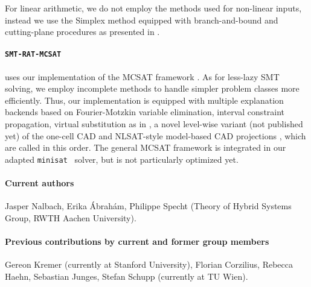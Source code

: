 \documentclass{article}
\begin{document}
For linear arithmetic, we do not employ the methods used for non-linear inputs, instead we use the Simplex method equipped with branch-and-bound and cutting-plane procedures as presented in \cite{DM06}.


\paragraph{\texttt{SMT-RAT-MCSAT}} uses our implementation of the MCSAT framework \cite{Moura2013}.
As for less-lazy SMT solving, we employ incomplete methods to handle simpler problem classes more efficiently. Thus, our implementation is equipped with multiple explanation backends based on Fourier-Motzkin variable elimination, interval constraint propagation, virtual substitution as in \cite{Abraham2017}, a novel level-wise variant (not published yet) of the one-cell CAD \cite{brown2015constructing} and NLSAT-style model-based CAD projections \cite{jovanovic2012solving}, which are called in this order. The general MCSAT framework is integrated in our adapted \texttt{minisat}~\cite{Een2003} solver, but is not particularly optimized yet.

\newpage

\paragraph{Current authors}
Jasper Nalbach, Erika \'Abrah\'am, Philippe Specht
(Theory of Hybrid Systems Group, RWTH Aachen University).

\paragraph{Previous contributions by current and former group members}
Gereon Kremer (currently at Stanford University),
Florian Corzilius,
Rebecca Haehn,
Sebastian Junges,
Stefan Schupp (currently at TU Wien).




\end{document}
